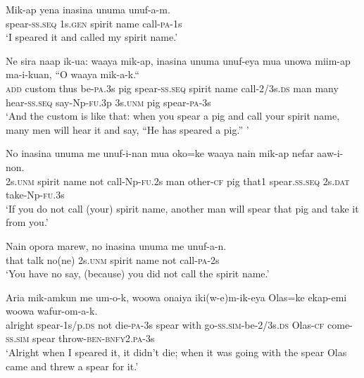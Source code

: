 \ea
\gll  Mik-ap  yena  inasina  unuma  unuf-a-m. \\
spear-\textsc{ss.seq}  1s.\textsc{gen}  spirit  name  call-\textsc{pa}-1s \\
\glt ‘I speared it and called my spirit name.’ \\
\z


\ea
\gll  Ne  sira  naap  ik-ua:  waaya  mik-ap,  inasina  unuma  unuf-eya         mua  unowa  miim-ap  ma-i-kuan,  ``O  waaya  mik-a-k.`` \\
\textsc{add}  custom  thus  be-\textsc{pa}.3s  pig  spear-\textsc{ss.seq}  spirit  name  call-2/3s.\textsc{ds}     man  many  hear-\textsc{ss.seq}  say-Np-\textsc{fu}.3p  3s.\textsc{unm}  pig  spear-\textsc{pa}-3s \\


\glt ‘And the custom is like that: when you spear a pig and call your spirit name, many men will hear it and say,  “He has speared a pig.” ’ \\
\z


\ea
\gll  No  inasina  unuma  me  unuf-i-nan  mua  oko=ke  waaya  nain    mik-ap  nefar  aaw-i-non. \\
2s.\textsc{unm}  spirit  name  not  call-Np-\textsc{fu}.2s  man  other-\textsc{cf}  pig  that1   spear.\textsc{ss.seq}  2s.\textsc{dat}  take-Np-\textsc{fu}.3s \\


\glt ‘If you do not call (your) spirit name, another man will spear that pig and take it from you.’ \\
\z


\ea
\gll  Nain  opora  marew,  no  inasina  unuma  me  unuf-a-n. \\
that  talk  no(ne)  2s.\textsc{unm}  spirit  name  not  call-\textsc{pa}-2s \\
\glt ‘You have no say, (because) you did not call the spirit name.’ \\
\z


\ea
\gll  Aria  mik-amkun  me  um-o-k,  woowa  onaiya  iki(w-e)m-ik-eya       Olas=ke  ekap-emi  woowa  wafur-om-a-k. \\
alright  spear-1s/p.\textsc{ds}  not  die-\textsc{pa}-3s  spear  with  go-\textsc{ss}.\textsc{sim}-be-2/3s.\textsc{ds} Olas-\textsc{cf}  come-\textsc{ss}.\textsc{sim}  spear  throw-\textsc{ben}-\textsc{bnfy}2.\textsc{pa}-3s \\


\glt ‘Alright when I speared it, it didn’t die; when it was going with the spear Olas came and threw a spear for it.’ \\
\z


